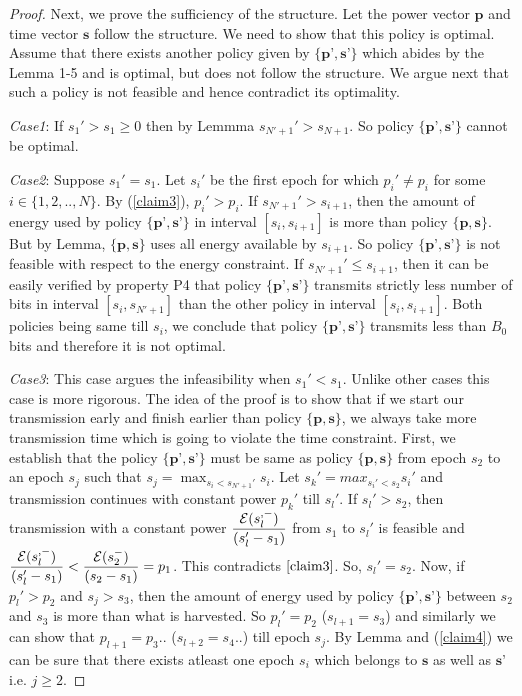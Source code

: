 \begin{proof}
Next, we prove the sufficiency of the structure. Let the power vector $\textbf{p}$ and time vector $\textbf{s}$ follow the structure. We need to show that this policy is optimal. Assume that there exists another policy given by $\{\textbf{p'},\textbf{s'}\}$ which abides by the Lemma 1-5 and is optimal, but does not follow the structure. We argue next that such a policy is not feasible and hence contradict its optimality. 

\textit{Case1}: If $s_1'>s_1\ge 0$ then by Lemmma  $s_{N'+1}'>s_{N+1}$. So policy $\{\textbf{p'},\textbf{s'}\}$ cannot be optimal. 

\textit{Case2}: Suppose $s_1'=s_1$. Let $s_i'$ be the first epoch for which $p_i'\ne p_i$ for some $i \in \{1,2,..,N\}$. By (\ref{claim3}), $p_i'>p_i$. If $s_{N'+1}'>s_{i+1}$, then the amount of energy used by policy $\{ \textbf{p'},\textbf{s'}\}$ in interval $[s_{i},s_{i+1}]$ is more than policy $\{\textbf{p},\textbf{s}\}$. But by Lemma, $\{\textbf{p},\textbf{s}\}$ uses all energy available by $s_{i+1}$. So policy $\{\textbf{p'},\textbf{s'}\}$ is not feasible with respect to the energy constraint. If $s_{N'+1}'\le s_{i+1}$, then it can be easily verified by property P4 that policy $\{\textbf{p'},\textbf{s'}\}$ transmits strictly less number of bits in interval $[s_i,s_{N'+1}]$ than the other policy in interval $[s_{i},s_{i+1}]$. Both policies being same till $s_i$, we conclude that policy $\{\textbf{p'},\textbf{s'}\}$ transmits less than $B_0$  bits and therefore it is not optimal.

\textit{Case3}: This case argues the infeasibility when $s_1'<s_1$. Unlike other cases this case is more rigorous. The idea of the proof is to show that if we start our transmission early and finish earlier than policy $\{\textbf{p},\textbf{s}\}$, we always take more transmission time which is going to violate the time constraint. First, we establish that the policy $\{\textbf{p'},\textbf{s'}\}$ must be same as policy $\{\textbf{p},\textbf{s}\}$ from epoch $s_2$ to an epoch $s_j$ such that $s_j=\max_{s_i<s_{N'+1}'} s_i$. Let $s_k'=max_{s_i'<s_2}s_i'$ and transmission continues with constant power $p_k'$ till $s_l'$. If $s_l'>s_2$, then transmission with a constant power $\dfrac{\mathcal{E}(s_l^{,-})}{(s_l'-s_1)} $ from $s_1$ to $s_l'$ is feasible and $\dfrac{\mathcal{E}(s_l^{,-})}{(s_l'-s_1)}<\dfrac{\mathcal{E}(s_2^-)}{(s_2-s_1)}=p_1$. This contradicts $\ref{claim3}$. So, $s_l'=s_2$. Now, if $p_l'>p_2$ and $s_j>s_3$, then the amount of energy used by policy $\{\textbf{p'},\textbf{s'}\}$ between $s_2$ and $s_3$ is more than what is harvested. So $p_l'=p_2$ ($s_{l+1}=s_3$) and similarly we can show that $p_{l+1}=p_3$.. ($ s_{l+2}=s_4$..) till epoch $s_j$. By Lemma and (\ref{claim4}) we can be sure that there exists atleast one epoch $s_i$ which belongs to $\textbf{s}$ as well as $\textbf{s'}$ i.e. $j\ge 2$.


\end{proof}
